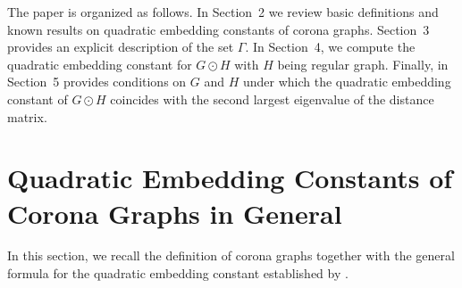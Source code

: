 \documentclass[pdflatex,sn-mathphys-num]{sn-jnl}
\theoremstyle{thmstyleone}%
\theoremstyle{thmstyletwo}%
\theoremstyle{thmstylethree}%
\begin{document}
The paper is organized as follows. In Section~2 we review basic definitions and known 
results on quadratic embedding constants of corona graphs. Section~3 provides an 
explicit description of the set $\Gamma$. In Section~4, we compute the quadratic 
embedding constant for $G\odot H$ with $H$ being regular graph. Finally, in Section~5 provides conditions on $G$ and $H$ under which the quadratic
embedding constant of $G\odot H$ coincides with the second largest
eigenvalue of the distance matrix.


\section{Quadratic Embedding Constants of Corona Graphs in General}

In this section, we recall the definition of corona graphs \cite{Frucht-Harary1970} 
together with the general formula for the quadratic embedding constant 
established by \cite{Ferdi-Baskoro-Obata-Santika2025}.
\end{document}
